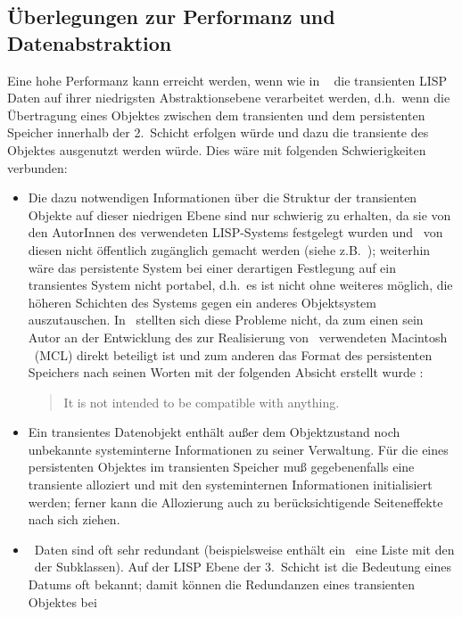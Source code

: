\subsection{\"{U}berlegungen zur Performanz und Datenabstraktion}%
\label{sec:plpeda}%
%
Eine hohe Performanz kann erreicht werden, wenn wie in
\wood\ \cite{bib:wo93} die transienten LISP Daten auf ihrer
niedrigsten Abstraktionsebene verarbeitet werden, d.h.\ wenn die
\"{U}ber\-tra\-gung eines Objektes zwischen dem transienten und dem
persistenten Speicher innerhalb der 2.~Schicht erfolgen w\"{u}rde und
dazu die transiente \representation{} des Objektes ausgenutzt werden
w\"{u}rde. Dies w\"{a}re mit folgenden Schwierigkeiten verbunden:
\begin{itemize}
%
\item Die dazu notwendigen Informationen \"{u}ber die Struktur der
transienten Objekte auf dieser niedrigen Ebene sind nur schwierig zu
erhalten, da sie von den AutorInnen des verwendeten LISP-Systems
festgelegt wurden und \ia\ von diesen nicht \"{o}ffentlich zug\"{a}nglich
gemacht werden (siehe z.B.\ \cite{bib:sn93}); weiterhin w\"{a}re das
persistente System bei einer derartigen Festlegung auf ein transientes
System nicht portabel, d.h.\ es ist nicht ohne weiteres m\"{o}glich, die
h\"{o}heren Schichten des Systems gegen ein anderes Objektsystem
auszutauschen. In \wood\ stellten sich diese Probleme nicht, da zum
einen sein Autor an der Entwicklung des zur Realisierung von
\wood\ verwendeten Macintosh \cl\ (MCL) direkt beteiligt ist und zum
anderen das Format des persistenten Speichers nach seinen Worten mit
der folgenden Absicht erstellt wurde \cite{bib:wo93}:
\begin{quote}
\rglqq It is not intended to be compatible with anything.\rgrqq
\end{quote}
%
\item Ein transientes Datenobjekt enth\"{a}lt au\ss{}er dem Objektzustand
noch unbekannte systeminterne Informationen zu seiner Verwaltung.
F\"{u}r die \representation{} eines persistenten Objektes im transienten
Speicher mu\ss{} gegebenenfalls eine transiente \representation{} alloziert
und mit den systeminternen Informationen initialisiert werden;
ferner kann die Allozierung auch zu ber\"{u}cksichtigende Seiteneffekte
nach sich ziehen.
%
\item \cl\ Daten sind oft sehr redundant (beispielsweise enth\"{a}lt ein
\clsmo\ eine Liste mit den \clsmo[en]\ der Subklassen). Auf
der LISP Ebene der 3.~Schicht ist die Bedeutung eines Datums oft
bekannt; damit k\"{o}n\-nen die Redundanzen eines transienten Objektes bei

\end{itemize}
